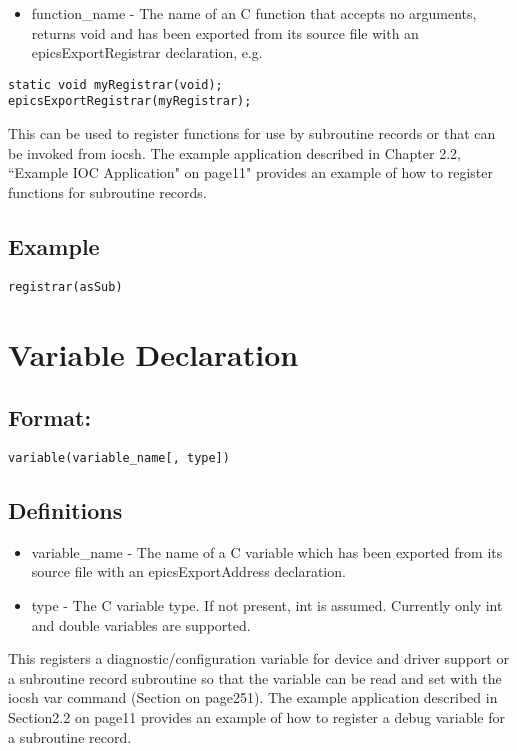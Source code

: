 \begin{itemize}\item {}function\_name - The name of an C function that accepts no arguments, returns void and has been exported from 
its source file with an epicsExportRegistrar declaration, e.g.

\end{itemize}\begin{verbatim}
static void myRegistrar(void);
epicsExportRegistrar(myRegistrar);
\end{verbatim}This can be used to register functions for use by subroutine records or that can be invoked from iocsh. The example 
application described in Chapter 2.2, ``Example IOC Application" on page11" provides an example of how to register 
functions for subroutine records.

\subsection{Example}

\begin{verbatim}registrar(asSub)
\end{verbatim}\section{Variable Declaration}

\subsection{Format:}

\begin{verbatim}variable(variable_name[, type])
\end{verbatim}\subsection{Definitions}

\begin{itemize}\item {}variable\_name - The name of a C variable which has been exported from its source file with an 
epicsExportAddress declaration.

\item {}type - The C variable type.  If not present, int is assumed.  Currently only int and double  variables are supported.

\end{itemize}This registers a diagnostic/configuration variable for device and driver support or a subroutine record subroutine so that 
the variable can be read and set with the iocsh var command (Section on page251). The example application described in 
Section2.2 on page11 provides an example of how to register a debug variable for a subroutine record.

